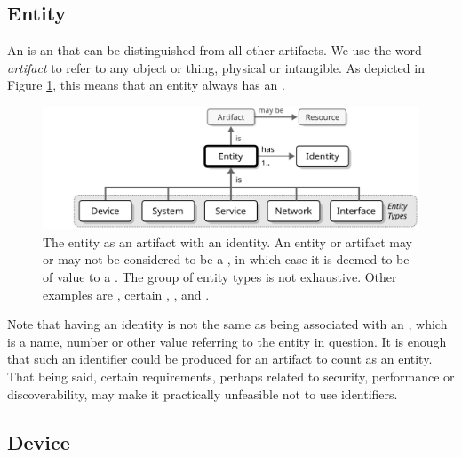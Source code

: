 \subsection{Entity}
\label{sec:reference-model:entity}

An  is an  that can be distinguished from all other artifacts.
We use the word \textit{artifact} to refer to any object or thing, physical or intangible.
As depicted in Figure \ref{fig:entity}, this means that an entity always has an .

\begin{figure}[ht!]
  \centering
  \includegraphics[scale=0.9]{figures/entity}
  \caption{
    The entity as an artifact with an identity.
    An entity or artifact may or may not be considered to be a , in which case it is deemed to be of value to a .
    The group of entity types is not exhaustive.
    Other examples are , certain , ,  and .
  }
  \label{fig:entity}
\end{figure}

\vspace*{0.9mm}

Note that having an identity is not the same as being associated with an , which is a name, number or other value referring to the entity in question.
It is enough that such an identifier could be produced for an artifact to count as an entity.
That being said, certain  requirements, perhaps related to security, performance or discoverability, may make it practically unfeasible not to use identifiers.

\subsection{Device}
\label{sec:reference-model:device}


